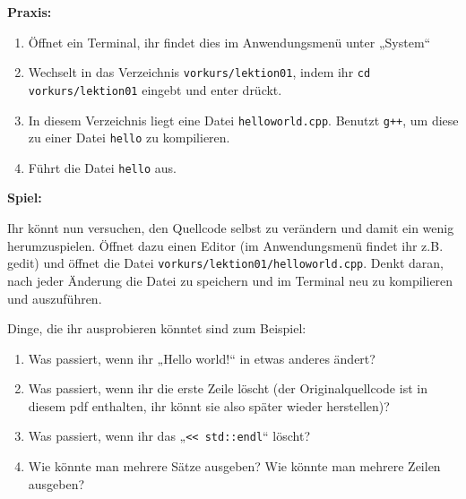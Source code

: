 \begin{center}
\end{center}

\textbf{Praxis:}
\begin{enumerate}
    \item Öffnet ein Terminal, ihr findet dies im Anwendungsmenü unter „System“
    \item Wechselt in das Verzeichnis \texttt{vorkurs/lektion01}, indem ihr
        \texttt{cd vorkurs/lektion01} eingebt und enter drückt.
    \item In diesem Verzeichnis liegt eine Datei \texttt{helloworld.cpp}.
        Benutzt \texttt{g++}, um diese zu einer Datei \texttt{hello} zu
        kompilieren.
    \item Führt die Datei \texttt{hello} aus.
\end{enumerate}


\textbf{Spiel:}

Ihr könnt nun versuchen, den Quellcode selbst zu verändern und damit ein wenig
herumzuspielen. Öffnet dazu einen Editor (im Anwendungsmenü findet ihr z.B.
gedit) und öffnet die Datei \texttt{vorkurs/lektion01/helloworld.cpp}. Denkt
daran, nach jeder Änderung die Datei zu speichern und im Terminal neu zu
kompilieren und auszuführen.

Dinge, die ihr ausprobieren könntet sind zum Beispiel:
\begin{enumerate}
    \item Was passiert, wenn ihr „Hello world!“ in etwas anderes ändert?
    \item Was passiert, wenn ihr die erste Zeile löscht (der Originalquellcode
        ist in diesem pdf enthalten, ihr könnt sie also später wieder
        herstellen)?
    \item Was passiert, wenn ihr das „\verb|<< std::endl|“ löscht?
    \item Wie könnte man mehrere Sätze ausgeben? Wie könnte man mehrere Zeilen
        ausgeben?
\end{enumerate}
